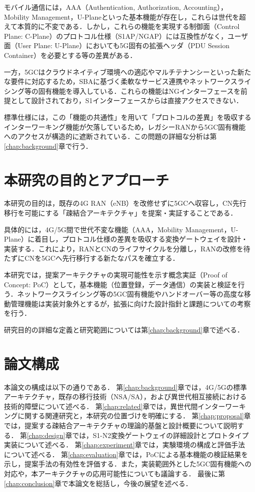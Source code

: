 モバイル通信には，AAA（Authentication, Authorization, Accounting），Mobility Management，U-Planeといった基本機能が存在し，これらは世代を超えて本質的に不変である\cite{Watanabe_ADMobile2025}．しかし，これらの機能を実現する制御面（Control Plane: C-Plane）のプロトコル仕様（S1AP/NGAP）には互換性がなく\cite{3GPP_TS36413,3GPP_TS38413}，ユーザ面（User Plane: U-Plane）においても5G固有の拡張ヘッダ（PDU Session Container）\cite{3GPP_TS29281}を必要とする等の差異がある．

一方，5GCはクラウドネイティブ環境への適応やマルチテナンシーといった新たな要件に対応するため，SBAに基づく柔軟なサービス連携やネットワークスライシング等の固有機能を導入している．これらの機能はNGインターフェースを前提として設計されており，S1インターフェースからは直接アクセスできない．

標準仕様には，この「機能の共通性」を用いて「プロトコルの差異」を吸収するインターワーキング機能が欠落しているため，レガシーRANから5GC固有機能へのアクセスが構造的に遮断されている．この問題の詳細な分析は第\ref{chap:background}章で行う．

\section{本研究の目的とアプローチ}

本研究の目的は，既存の4G RAN（eNB）を改修せずに5GCへ収容し，CN先行移行を可能にする「疎結合アーキテクチャ」を提案・実証することである．

具体的には，4G/5G間で世代不変な機能（AAA，Mobility Management，U-Plane）に着目し，プロトコル仕様の差異を吸収する変換ゲートウェイを設計・実装する．これにより，RANとCNのライフサイクルを分離し，RANの改修を待たずにCNを5GCへ先行移行する新たなパスを確立する．

本研究では，提案アーキテクチャの実現可能性を示す概念実証（Proof of Concept: PoC）として，基本機能（位置登録，データ通信）の実装と検証を行う．ネットワークスライシング等の5GC固有機能やハンドオーバー等の高度な移動管理機能は実装対象外とするが，拡張に向けた設計指針と課題についての考察を行う．

研究目的の詳細な定義と研究範囲については第\ref{chap:background}章で述べる．

\section{論文構成}

本論文の構成は以下の通りである．
第\ref{chap:background}章では，4G/5Gの標準アーキテクチャ，既存の移行技術（NSA/SA），および異世代相互接続における技術的障壁について述べる．
第\ref{chap:related}章では，異世代間インターワーキングに関する関連研究と，本研究の位置づけを明確にする．
第\ref{chap:proposal}章では，提案する疎結合アーキテクチャの理論的基盤と設計概要について説明する．
第\ref{chap:design}章では，S1-N2変換ゲートウェイの詳細設計とプロトタイプ実装について述べる．
第\ref{chap:experiment}章では，実験環境の構成と評価手法について述べる．
第\ref{chap:evaluation}章では，PoCによる基本機能の検証結果を示し，提案手法の有効性を評価する．また，実装範囲外とした5GC固有機能への対応や，本アーキテクチャの応用可能性についても議論する．
最後に第\ref{chap:conclusion}章で本論文を総括し，今後の展望を述べる．
